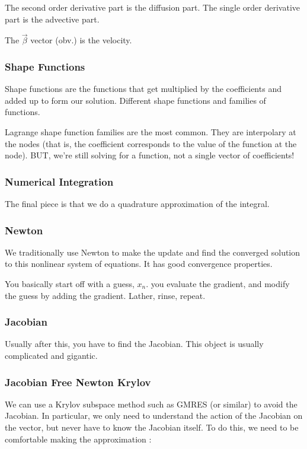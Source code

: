 The second order derivative part is the diffusion part. 
The single order derivative part is the advective part. 

The $\vec{\beta}$ vector (obv.) is the velocity. 

\subsubsection{Shape Functions}

Shape functions are the functions that get multiplied by the coefficients and 
added up to form our solution. Different shape functions and families of 
functions.

Lagrange shape function families are the most common. They are 
interpolary at the nodes (that is, the coefficient corresponds to the value of 
the function at the node). BUT, we're still solving for a function, not a single 
vector of coefficients!

\subsubsection{Numerical Integration}

The final piece is that we do a quadrature approximation of the integral. 

\subsubsection{Newton}

We traditionally use Newton to make the update and find the converged solution 
to this nonlinear system of equations. It has good convergence properties.  

You basically start off with a guess, $x_n$. you evaluate the gradient, and 
modify the guess by adding the gradient. Lather, rinse, repeat. 



\subsubsection{Jacobian}
Usually after this, you have to find the Jacobian. This object is usually 
complicated and gigantic. 

\subsubsection{Jacobian Free Newton Krylov}

We can use a Krylov subspace method such as GMRES (or similar) to avoid the 
Jacobian. In particular, we only need to understand the action of the Jacobian 
on the vector, but never have to know the Jacobian itself. To do this, we need 
to be comfortable making the approximation :

